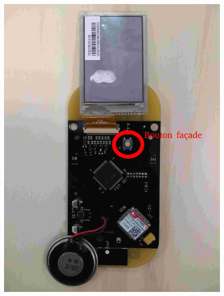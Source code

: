 \documentclass{article}
\begin{document}
\begin{figure}[H]
\begin{minipage}[b]{0.45\textwidth}
  \end{minipage}
  \hfill
  \begin{minipage}[b]{0.45\textwidth}
    \includegraphics[width=\textwidth]{base_dos_bouton.jpg}
    
  \end{minipage}
\end{figure}
\end{document}
